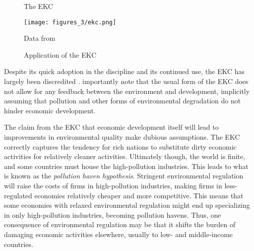 \begin{figure}
\centering
\begin{minipage}{0.48 \textwidth}
\caption{The EKC \label{EKC}}
\end{minipage}
\begin{minipage}{0.48\textwidth}
\centering 
\caption{Application of the  EKC}
\texttt{[image: figures\_3/ekc.png]}
\end{minipage}
Data from \cite{owidoutdoorairpollution} 
\end{figure}

Despite its quick adoption in the discipline and its continued use, the EKC has largely been discredited \citep{stern2004rise}. \cite{arrow1995economic} importantly note that the usual form of the EKC does not allow for any feedback between the environment and development, implicitly assuming that pollution and other forms of environmental degradation do not hinder economic development. 

The claim from the EKC that economic development itself will lead to improvements in environmental quality make dubious assumptions. The EKC correctly captures the tendency for rich nations to substitute dirty economic activities for relatively cleaner activities. Ultimately though, the world is finite, and some countries must house the high-pollution industries. This leads to what is known as the \emph{pollution haven hypothesis}. Stringent environmental regulation will raise the costs of firms in high-pollution industries, making firms in less-regulated economies relatively cheaper and more competitive. This means that some economies with relaxed environmental regulation might end up specializing in only high-pollution industries, becoming pollution havens. Thus, one consequence of environmental regulation may be that it shifts the burden of damaging economic activities elsewhere, usually to low- and middle-income countries. 

